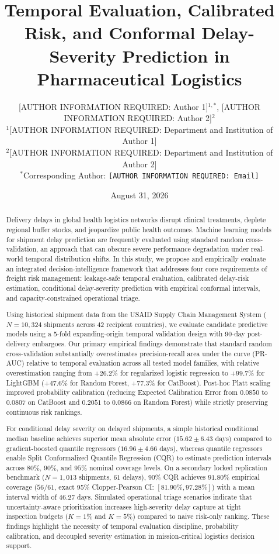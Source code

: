 \documentclass[11pt,a4paper]{article}
\title{\textbf{Temporal Evaluation, Calibrated Risk, and Conformal Delay-Severity Prediction in Pharmaceutical Logistics}}
\author{
  [AUTHOR INFORMATION REQUIRED: Author 1]$^{1,*}$,
  [AUTHOR INFORMATION REQUIRED: Author 2]$^2$\\[1ex]
  $^1$[AUTHOR INFORMATION REQUIRED: Department and Institution of Author 1]\\
  $^2$[AUTHOR INFORMATION REQUIRED: Department and Institution of Author 2]\\[1ex]
  $^*$Corresponding Author: \texttt{[AUTHOR INFORMATION REQUIRED: Email]}
}
\date{August 31, 2026}
\begin{document}
\maketitle

\begin{abstract}
Delivery delays in global health logistics networks disrupt clinical treatments, deplete regional buffer stocks, and jeopardize public health outcomes. Machine learning models for shipment delay prediction are frequently evaluated using standard random cross-validation, an approach that can obscure severe performance degradation under real-world temporal distribution shifts. In this study, we propose and empirically evaluate an integrated decision-intelligence framework that addresses four core requirements of freight risk management: leakage-safe temporal evaluation, calibrated delay-risk estimation, conditional delay-severity prediction with empirical conformal intervals, and capacity-constrained operational triage. 

Using historical shipment data from the USAID Supply Chain Management System ($N = 10,324$ shipments across 42 recipient countries), we evaluate candidate predictive models using a 5-fold expanding-origin temporal validation design with 90-day post-delivery embargoes. Our primary empirical findings demonstrate that standard random cross-validation substantially overestimates precision-recall area under the curve (PR-AUC) relative to temporal evaluation across all tested model families, with relative overestimation ranging from $+26.2\%$ for regularized logistic regression to $+99.7\%$ for LightGBM ($+47.6\%$ for Random Forest, $+77.3\%$ for CatBoost). Post-hoc Platt scaling improved probability calibration (reducing Expected Calibration Error from $0.0850$ to $0.0807$ on CatBoost and $0.2051$ to $0.0866$ on Random Forest) while strictly preserving continuous risk rankings. 

For conditional delay severity on delayed shipments, a simple historical conditional median baseline achieves superior mean absolute error ($15.62 \pm 6.43$ days) compared to gradient-boosted quantile regressors ($16.96 \pm 4.66$ days), whereas quantile regressors enable Split Conformalized Quantile Regression (CQR) to estimate prediction intervals across $80\%$, $90\%$, and $95\%$ nominal coverage levels. On a secondary locked replication benchmark ($N = 1,013$ shipments, $61$ delays), $90\%$ CQR achieves $91.80\%$ empirical coverage ($56/61$, exact 95\% Clopper-Pearson CI: $[81.90\%, 97.28\%]$) with a mean interval width of $46.27$ days. Simulated operational triage scenarios indicate that uncertainty-aware prioritization increases high-severity delay capture at tight inspection budgets ($K = 1\%$ and $K = 5\%$) compared to naive risk-only ranking. These findings highlight the necessity of temporal evaluation discipline, probability calibration, and decoupled severity estimation in mission-critical logistics decision support.
\end{abstract}
\end{document}
